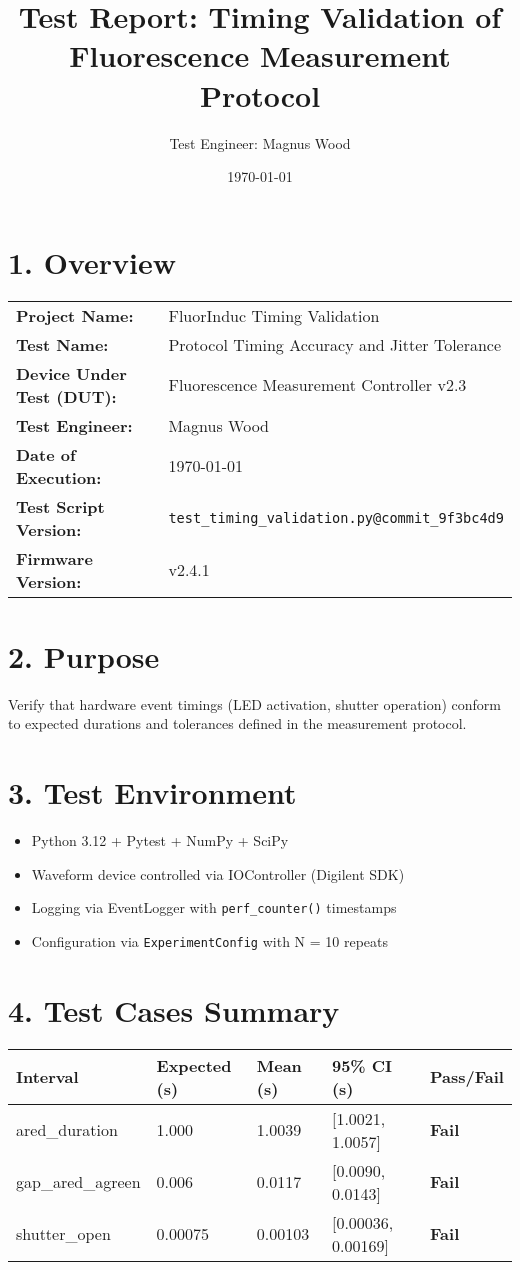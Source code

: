 \documentclass[11pt]{article}
\title{Test Report: Timing Validation of Fluorescence Measurement Protocol}
\author{Test Engineer: Magnus Wood}
\date{\today}
\begin{document}
\maketitle
\section*{1. Overview}
\begin{tabular}{@{}ll}
\textbf{Project Name:} & FluorInduc Timing Validation \\
\textbf{Test Name:} & Protocol Timing Accuracy and Jitter Tolerance \\
\textbf{Device Under Test (DUT):} & Fluorescence Measurement Controller v2.3 \\
\textbf{Test Engineer:} & Magnus Wood \\
\textbf{Date of Execution:} & \today \\
\textbf{Test Script Version:} & \texttt{test_timing_validation.py@commit\_9f3bc4d9} \\
\textbf{Firmware Version:} & v2.4.1 \\
\end{tabular}

\section*{2. Purpose}
Verify that hardware event timings (LED activation, shutter operation) conform to expected durations and tolerances defined in the measurement protocol.

\section*{3. Test Environment}
\begin{itemize}
  \item Python 3.12 + Pytest + NumPy + SciPy
  \item Waveform device controlled via IOController (Digilent SDK)
  \item Logging via EventLogger with \texttt{perf\_counter()} timestamps
  \item Configuration via \texttt{ExperimentConfig} with N = 10 repeats
\end{itemize}

\section*{4. Test Cases Summary}

\begin{longtable}{@{}lllll@{}}
\toprule
\textbf{Interval} & \textbf{Expected (s)} & \textbf{Mean (s)} & \textbf{95\% CI (s)} & \textbf{Pass/Fail} \\
\midrule
ared\_duration & 1.000 & 1.0039 & [1.0021, 1.0057] & \textbf{Fail} \\
gap\_ared\_agreen & 0.006 & 0.0117 & [0.0090, 0.0143] & \textbf{Fail} \\
shutter\_open & 0.00075 & 0.00103 & [0.00036, 0.00169] & \textbf{Fail} \\
\bottomrule
\end{longtable}
\end{document}
